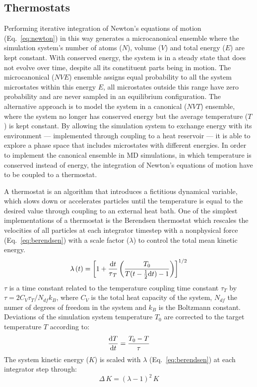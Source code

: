 \subsection{Thermostats}
%
%
Performing iterative integration of Newton's equations of motion (Eq.~\ref{eq:newton}) in this way generates a microcanonical ensemble where the simulation system's number of atoms ($N$), volume ($V$) and total energy ($E$) are kept constant. With conserved energy, the system is in a steady state that does not evolve over time, despite all its constituent parts being in motion. The microcanonical ($NVE$) ensemble assigns equal probability to all the system microstates within this energy $E$, all microstates outside this range have zero probability and are never sampled in an equilibrium configuration. The alternative approach is to model the system in a canonical ($NVT$) ensemble, where the system no longer has conserved energy but the average temperature ($T$) is kept constant. By allowing the simulation system to exchange energy with its environment --- implemented through coupling to a heat reservoir --- it is able to explore a phase space that includes microstates with different energies.\cite{ford2013statistical} In order to implement the canonical ensemble in MD simulations, in which temperature is conserved instead of energy, the integration of Newton's equations of motion have to be coupled to a thermostat. 

A thermostat is an algorithm that introduces a fictitious dynamical variable, which slows down or accelerates particles until the temperature is equal to the desired value through coupling to an external heat bath. One of the simplest implementations of a thermostat is the Berendsen thermostat which rescales the velocities of all particles at each integrator timestep with a nonphysical force (Eq.~\ref{eq:berendsen}) with a scale factor ($\lambda$) to control the total mean kinetic energy.\cite{berendsen1984molecular} 
%
\begin{equation} \label{eq:berendsen}
    \lambda\,(t) = \left[    1 + \frac{\mathrm{d}t}{\tau_{\,T}} \left( \frac{T_0}{T(t-\frac{1}{2}\mathrm{d}t) - 1}   \right) \right]^{1/2}
\end{equation}
%
$\tau$ is a time constant related to the temperature coupling time constant $\tau_T$ by $\tau = 2C_V \tau_T / N_{df}k_B$, where $C_V$ is the total heat capacity of the system, $N_{df}$ the numer of degrees of freedom in the system and $k_B$ is the Boltzmann constant. Deviations of the simulation system temperature $T_0$ are corrected to the target temperature $T$ according to:
\begin{equation} \label{eq:berendsen_rate}
    \frac{\mathrm{d}T}{\mathrm{d}t}  = \frac{T_0 - T}{\tau}
\end{equation}
%
The system kinetic energy ($K$) is scaled with $\lambda$ (Eq.~\ref{eq:berendsen}) at each integrator step through:
\begin{equation} \label{eq:berendsen_kinetic}
    \Delta\, K = (\lambda - 1)^2\, K
\end{equation}


